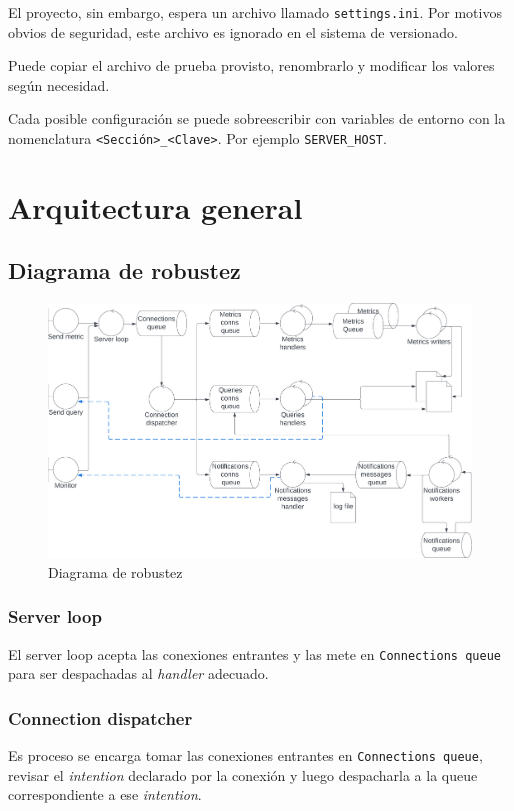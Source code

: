 \documentclass[titlepage,a4paper,oneside]{article}
\begin{document}
El proyecto, sin embargo, espera un archivo llamado \texttt{settings.ini}. Por motivos obvios de seguridad, este archivo es ignorado en el sistema de versionado.

Puede copiar el archivo de prueba provisto, renombrarlo y modificar los valores según necesidad.

Cada posible configuración se puede sobreescribir con variables de entorno con la nomenclatura \texttt{<Sección>\_<Clave>}. Por ejemplo \texttt{SERVER\_HOST}.

\section{Arquitectura general}
\subsection{Diagrama de robustez} \label{robustez}
\begin{figure}[H]
\centering
\includegraphics[width=\textwidth]{images/diagrama_robustez.png}
\caption{Diagrama de robustez}
\end{figure}

\subsubsection{Server loop}
El server loop acepta las conexiones entrantes y las mete en \texttt{Connections queue} para ser despachadas al \textit{handler} adecuado.

\subsubsection{Connection dispatcher}
Es proceso se encarga tomar las conexiones entrantes en \texttt{Connections queue}, revisar el \textit{intention} declarado por la conexión y luego despacharla a la queue correspondiente a ese \textit{intention}.
\end{document}
